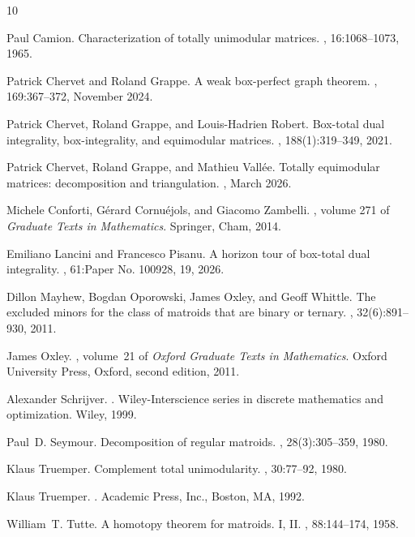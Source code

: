 \documentclass{amsart}
\numberwithin{equation}{section}
\begin{document}
\begin{thebibliography}{10}

Paul Camion.
\newblock Characterization of totally unimodular matrices.
, 16:1068--1073, 1965.

Patrick Chervet and Roland Grappe.
\newblock A weak box-perfect graph theorem.
, 169:367–372, November 2024.

Patrick Chervet, Roland Grappe, and Louis-Hadrien Robert.
\newblock Box-total dual integrality, box-integrality, and equimodular matrices.
, 188(1):319--349, 2021.

Patrick Chervet, Roland Grappe, and Mathieu Vallée.
\newblock Totally equimodular matrices: decomposition and triangulation.
, March 2026.

Michele Conforti, G\'erard Cornu\'ejols, and Giacomo Zambelli.
, volume 271 of {\em Graduate Texts in Mathematics}.
\newblock Springer, Cham, 2014.

Emiliano Lancini and Francesco Pisanu.
\newblock A horizon tour of box-total dual integrality.
, 61:Paper No. 100928, 19, 2026.

Dillon Mayhew, Bogdan Oporowski, James Oxley, and Geoff Whittle.
\newblock The excluded minors for the class of matroids that are binary or ternary.
, 32(6):891--930, 2011.

James Oxley.
, volume~21 of {\em Oxford Graduate Texts in Mathematics}.
\newblock Oxford University Press, Oxford, second edition, 2011.

Alexander Schrijver.
.
\newblock Wiley-Interscience series in discrete mathematics and optimization. Wiley, 1999.

Paul~D. Seymour.
\newblock Decomposition of regular matroids.
, 28(3):305--359, 1980.

Klaus Truemper.
\newblock Complement total unimodularity.
, 30:77--92, 1980.

Klaus Truemper.
.
\newblock Academic Press, Inc., Boston, MA, 1992.

William~T. Tutte.
\newblock A homotopy theorem for matroids. {I}, {II}.
, 88:144--174, 1958.

\end{thebibliography}
\end{document}
